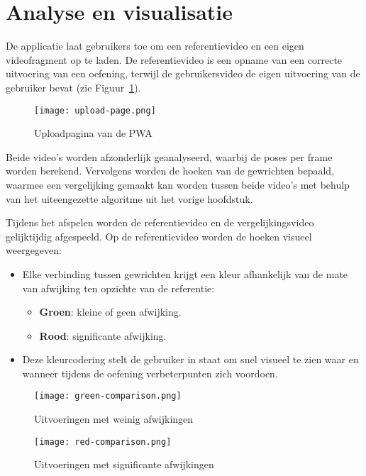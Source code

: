 \section{Analyse en visualisatie}
De applicatie laat gebruikers toe om een referentievideo en een eigen videofragment op te laden. 
De referentievideo is een opname van een correcte uitvoering van een oefening, terwijl de gebruikersvideo de eigen uitvoering van de gebruiker bevat (zie Figuur~\ref{fig:upload_page}).

\begin{figure}[H]
  \centering
  \texttt{[image: upload-page.png]}
  \caption[Upload page]{\label{fig:upload_page}Uploadpagina van de PWA}
\end{figure}

Beide video’s worden afzonderlijk geanalyseerd, waarbij de poses per frame worden berekend. 
Vervolgens worden de hoeken van de gewrichten bepaald, waarmee een vergelijking gemaakt kan worden tussen beide video’s met behulp van het uiteengezette algoritme uit het vorige hoofdstuk.

Tijdens het afspelen worden de referentievideo en de vergelijkingsvideo gelijktijdig afgespeeld. Op de referentievideo worden de hoeken visueel weergegeven:
\begin{itemize}
    \item Elke verbinding tussen gewrichten krijgt een kleur afhankelijk van de mate van afwijking ten opzichte van de referentie:
    \begin{itemize}
        \item \textbf{Groen}: kleine of geen afwijking.
        \item \textbf{Rood}: significante afwijking.
    \end{itemize}
    \item Deze kleurcodering stelt de gebruiker in staat om snel visueel te zien waar en wanneer tijdens de oefening verbeterpunten zich voordoen.
\end{itemize}

\begin{figure}[h]
  \centering
  \begin{minipage}{0.45\textwidth}
      \centering
      \texttt{[image: green-comparison.png]}
      \caption[Weinig afwijking]{\label{fig:green_comparison}Uitvoeringen met weinig afwijkingen}
  \end{minipage}
  \hfill %
  \begin{minipage}{0.45\textwidth}
      \centering
      \texttt{[image: red-comparison.png]}
      \caption[significante afwijking]{\label{fig:red_comparison}Uitvoeringen met significante afwijkingen}
  \end{minipage}
\end{figure}   
